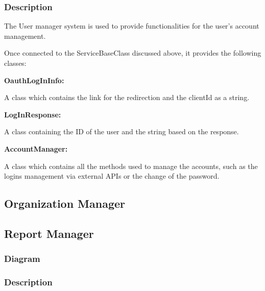 \documentclass{article}
\begin{document}
\subsubsection{Description}

The User manager system is used to provide functionalities for the user's account management.

Once connected to the ServiceBaseClass discussed above, it provides the following classes:

  \item \textbf{OauthLogInInfo: }
  
  A class which contains the link for the redirection and the clientId as a string.

  \item \textbf{LogInResponse: }
  
  A class containing the ID of the user and the string based on the response.

  \item \textbf{AccountManager: }

  A class which contains all the methods used to manage the accounts, such as the logins management via external APIs or the change of the password.

\subsection{Organization Manager}

\subsection{Report Manager} %

\subsubsection{Diagram}

\subsubsection{Description}
\end{document}
